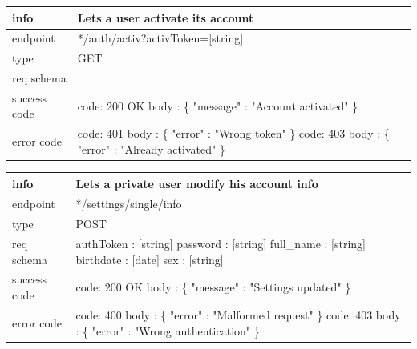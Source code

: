 \documentclass[titlepage]{article}
\begin{document}
\vspace{\baselineskip}

\begin{tabularx}{\textwidth}{lX} \hline
    info & Lets a user activate its account \\ \hline
    endpoint & */auth/activ?activToken=[string] \\ \hline
    type & GET \\ \hline
    req schema & \\ \hline
    success code &
        code: 200 OK \newline \newline 
        body : \{ \newline
        "message" : "Account activated" \newline
        \} \\ \hline
    error code &
        code: 401 \newline
        body : \{ "error" : "Wrong token" \} \newline \newline
        code: 403 \newline
        body : \{ "error" : "Already activated" \} \\ \hline
\end{tabularx}
		
\vspace{\baselineskip}

\begin{tabularx}{\textwidth}{lX} \hline
    info & Lets a private user modify his account info \\ \hline
    endpoint & */settings/single/info \\ \hline
    type & POST \\ \hline
    req schema & 
        authToken : [string] \newline
        password : [string] \newline
        full\_name : [string] \newline
        birthdate : [date] \newline
        sex : [string] \\ \hline
    success code &
        code: 200 OK \newline \newline 
        body : \{ \newline
        "message" : "Settings updated" \newline
        \} \\ \hline
    error code &
        code: 400 \newline
        body : \{ "error" : "Malformed request" \} \newline \newline
        code: 403 \newline
        body : \{ "error" : "Wrong authentication" \} \\ \hline
\end{tabularx}
		
\end{document}
